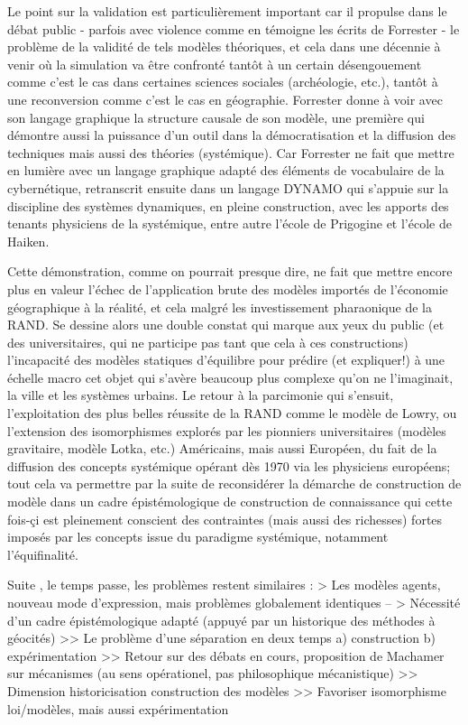 Le point sur la validation est particulièrement important car il propulse dans le débat public - parfois avec violence comme en témoigne les écrits de Forrester -   le problème de la validité de tels modèles théoriques, et cela dans une décennie à venir où la simulation va être confronté tantôt à un certain désengouement comme c'est le cas dans certaines sciences sociales (archéologie, etc.), tantôt à une reconversion comme c'est le cas en géographie. Forrester donne à voir avec son langage graphique la structure causale de son modèle, une première qui démontre aussi la puissance d'un outil dans la démocratisation et la diffusion des techniques mais aussi des théories (systémique). Car Forrester ne fait que mettre en lumière avec un langage graphique adapté des éléments de vocabulaire de la cybernétique, retranscrit ensuite dans un langage DYNAMO qui s'appuie sur la discipline des systèmes dynamiques, en pleine construction, avec les apports des tenants physiciens de la systémique, entre autre l'école de Prigogine et l'école de Haiken.

Cette démonstration, comme on pourrait presque dire, ne fait que mettre encore plus en valeur l'échec de l'application brute des modèles importés de l'économie géographique à la réalité, et cela malgré les investissement pharaonique de la RAND. Se dessine alors une double constat qui marque aux yeux du public (et des universitaires, qui ne participe pas tant que cela à ces constructions) \autocite{Lee1973} l'incapacité des modèles statiques d'équilibre pour prédire (et expliquer!) à une échelle macro cet objet qui s'avère beaucoup plus complexe qu'on ne l'imaginait, la ville et les systèmes urbains. Le retour à la parcimonie qui s'ensuit, l'exploitation des plus belles réussite de la RAND comme le modèle de Lowry,  ou l'extension des isomorphismes explorés par les pionniers universitaires (modèles gravitaire, modèle Lotka, etc.) Américains, mais aussi Européen, du fait de la diffusion des concepts systémique opérant dès 1970 via les physiciens européens; tout cela va permettre par la suite de reconsidérer la démarche de construction de modèle dans un cadre épistémologique de construction de connaissance qui cette fois-çi est pleinement conscient des contraintes (mais aussi des richesses) fortes imposés par les concepts issue du paradigme systémique, notamment l'équifinalité.

Suite , le temps passe, les problèmes restent similaires :
> Les modèles agents, nouveau mode d'expression, mais problèmes globalement identiques --
> Nécessité d'un cadre épistémologique adapté (appuyé par un historique des méthodes à géocités)
	>> Le problème d'une séparation en deux temps a) construction b) expérimentation 
	>> Retour sur des débats en cours, proposition de Machamer sur mécanismes (au sens opérationel, pas philosophique mécanistique)
	>> Dimension historicisation construction des modèles
	>> Favoriser isomorphisme loi/modèles, mais aussi expérimentation
	

